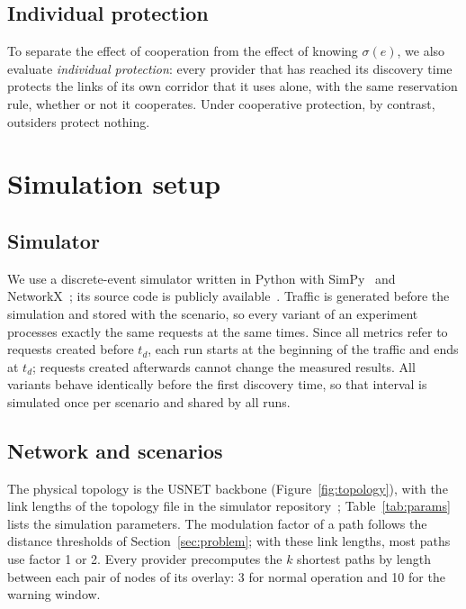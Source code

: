 \documentclass[11pt,a4paper]{article}
\theoremstyle{definition}
\begin{document}
\subsection{Individual protection}

To separate the effect of cooperation from the effect of knowing $\sigma(e)$, we also evaluate \emph{individual protection}: every provider that has reached its discovery time protects the links of its own corridor that it uses alone, with the same reservation rule, whether or not it cooperates.
Under cooperative protection, by contrast, outsiders protect nothing.

\section{Simulation setup}
\label{sec:setup}

\subsection{Simulator}

We use a discrete-event simulator written in Python with SimPy~\cite{simpy} and NetworkX~\cite{networkx}; its source code is publicly available~\cite{simulator}.
Traffic is generated before the simulation and stored with the scenario, so every variant of an experiment processes exactly the same requests at the same times.
Since all metrics refer to requests created before $t_d$, each run starts at the beginning of the traffic and ends at $t_d$; requests created afterwards cannot change the measured results.
All variants behave identically before the first discovery time, so that interval is simulated once per scenario and shared by all runs.

\subsection{Network and scenarios}

The physical topology is the USNET backbone (Figure~\ref{fig:topology}), with the link lengths of the topology file in the simulator repository~\cite{simulator}; Table~\ref{tab:params} lists the simulation parameters.
The modulation factor of a path follows the distance thresholds of Section~\ref{sec:problem}; with these link lengths, most paths use factor 1 or 2.
Every provider precomputes the $k$ shortest paths by length between each pair of nodes of its overlay: 3 for normal operation and 10 for the warning window.
\end{document}
